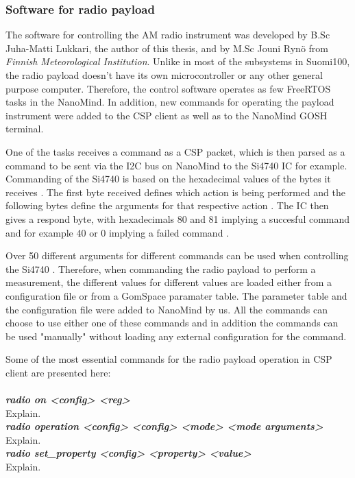 \documentclass[english,12pt,a4paper,pdftex,elec,utf8]{aaltothesis}
\begin{document}
\subsubsection{Software for radio payload}
The software for controlling the AM radio instrument was developed by B.Sc Juha-Matti Lukkari, the author of this thesis, and by M.Sc Jouni Rynö from \textit{Finnish Meteorological Institution}. Unlike in most of the subsystems in Suomi100, the radio payload doesn't have its own microcontroller or any other general purpose computer. Therefore, the control software operates as few FreeRTOS tasks in the NanoMind. In addition, new commands for operating the payload instrument were added to the CSP client as well as to the NanoMind GOSH terminal.  \par
One of the tasks receives a command as a CSP packet, which is then parsed as a command to be sent via the I2C bus on NanoMind to the Si4740 IC for example. Commanding of the Si4740 is based on the hexadecimal values of the bytes it receives \cite{sids}. The first byte received defines which action is being performed and the following bytes define the arguments for that respective action \cite{sids}. The IC then gives a respond byte, with hexadecimals 80 and 81 implying a succesful command and for example 40 or 0 implying a failed command \cite{sids}. \par
Over 50 different arguments for different commands can be used when controlling the Si4740 \cite{sids}. Therefore, when commanding the radio payload to perform a measurement, the different values for different values are loaded either from a configuration file or from a GomSpace paramater table. The parameter table and the configuration file were added to NanoMind by us. All the commands can choose to use either one of these commands and in addition the commands can be used "manually" without loading any external configuration for the command. \par
Some of the most essential commands for the radio payload operation in CSP client are presented here:
\\
\\
\textit{\textbf{radio on <config> <reg>}}\\
Explain.\\
\textit{\textbf{radio operation <config> <config> <mode> <mode arguments>}}\\
Explain.\\ 
\textit{\textbf{radio set\_property <config> <property> <value>}}\\
Explain.\\
\end{document}
